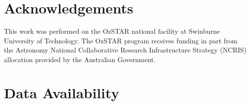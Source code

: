 \documentclass[fleqn,usenatbib]{mnras}
\begin{document}

\section*{Acknowledgements}

This work was performed on the OzSTAR national facility at Swinburne University of Technology. The OzSTAR program receives funding in part from the Astronomy National Collaborative Research Infrastructure Strategy (NCRIS) allocation provided by the Australian Government.

\section*{Data Availability}











\end{document}
